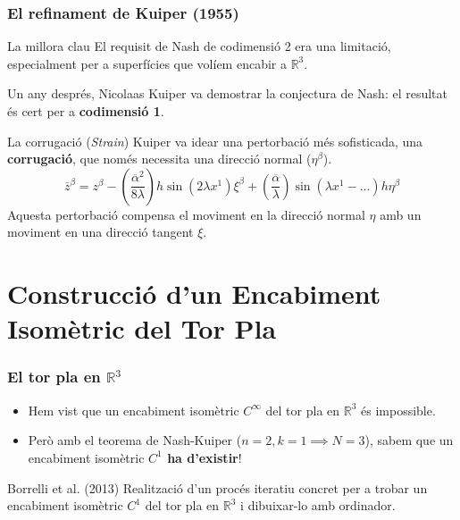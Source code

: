 \documentclass[10pt]{beamer}
\begin{document}
\begin{frame}
    \frametitle{El refinament de Kuiper (1955)}
    
    \begin{block}{La millora clau}
        El requisit de Nash de codimensió 2 era una limitació, especialment per a superfícies que volíem encabir a $\mathbb{R}^3$.
        
        Un any després, Nicolaas Kuiper va demostrar la conjectura de Nash: el resultat és cert per a \textbf{codimensió 1}.
    \end{block}
    \pause
    
    \begin{block}{La corrugació (\textit{Strain})}
        Kuiper va idear una pertorbació més sofisticada, una \textbf{corrugació}, que només necessita una direcció normal ($\eta^\beta$).
        \begin{equation*}
            \boxed{
                \overline{z}^\beta = z^\beta - \left(\frac{\overline \alpha^2}{8\lambda}\right)h\sin\left(2\lambda x^1\right)\xi^\beta + \left(\frac{\overline\alpha}{\lambda}\right)\sin\left(\lambda x^1 - \dots\right)h\eta^\beta
            }
        \end{equation*}
        Aquesta pertorbació compensa el moviment en la direcció normal $\eta$ amb un moviment en una direcció tangent $\xi$.
    \end{block}

\end{frame}

\section{Construcció d'un Encabiment Isomètric del Tor Pla}

\begin{frame}
    \frametitle{El tor pla en $\mathbb{R}^3$}
    
    \begin{itemize}
            \item Hem vist que un encabiment isomètric $C^\infty$ del tor pla en $\mathbb{R}^3$ és impossible.
            \item Però amb el teorema de Nash-Kuiper ($n=2, k=1 \implies N=3$), sabem que un encabiment isomètric \textbf{$C^1$ ha d'existir}!
        \end{itemize}
    \pause
    
    \begin{block}{Borrelli et al. (2013)}
        Realització d'un procés iteratiu concret per a trobar un encabiment isomètric $C^1$ del tor pla en $\mathbb{R}^3$ i dibuixar-lo amb ordinador.
    \end{block}
\end{frame}
\end{document}
